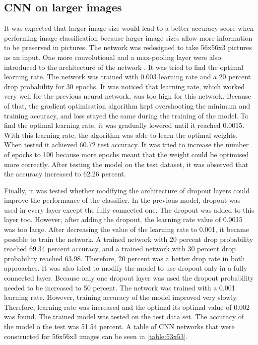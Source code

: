 \subsection{CNN on larger images}

It was expected that larger image size would lead to a better accuracy score when performing image classification because larger image sizes allow more information to be preserved in pictures. The network was redesigned to take 56x56x3 pictures as an input. One more convolutional and a max-pooling layer were also introduced to the architecture of the network . It was tried to find the optimal learning rate. The network was trained with 0.003 learning rate and a 20 percent drop probability for 30 epochs. It was noticed that learning rate, which worked very well for the previous neural network, was too high for this network. Because of that, the gradient optimisation algorithm kept overshooting the minimum and training accuracy, and loss stayed the same during the training of the model. To find the optimal learning rate, it was gradually lowered until it reached 0.0015. With this learning rate, the algorithm was able to learn the optimal weights. When tested it achieved 60.72 test accuracy. It was tried to increase the number of epochs to 100 because more epochs meant that the weight could be optimised more correctly. After testing the model on the test dataset, it was observed that the accuracy increased to 62.26 percent.

Finally, it was tested whether modifying the architecture of dropout layers could improve the performance of the classifier. In the previous model, dropout was used in every layer except the fully connected one. The dropout was added to this layer too. However, after adding the dropout, the learning rate value of 0.0015 was too large. After decreasing the value of the learning rate to 0.001, it became possible to train the network. A trained network with 20 percent drop probability reached 69.34 percent accuracy, and a trained network with 30 percent drop probability reached 63.98. Therefore, 20 percent was a better drop rate in both approaches. It was also tried to modify the model to use dropout only in a fully connected layer. Because only one dropout layer was used the dropout probability needed to be increased to 50 percent. The network was trained with a 0.001 learning rate. However, training accuracy of the model improved very slowly. Therefore, learning rate was increased and the optimal its optimal value of 0.002 was found. The trained model was tested on the test data set. The accuracy of the model o the test was 51.54 percent. A table of CNN networks that were constructed for 56x56x3 images can be seen in \autoref{table:53x53}.


